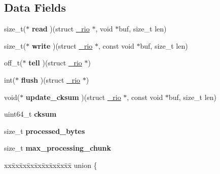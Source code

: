 \subsection*{Data Fields}
\begin{DoxyCompactItemize}
\item 
\mbox{\label{struct__rio_a8ebabb369aa4d0d56b6ffd2458d88576}} 
size\+\_\+t($\ast$ {\bfseries read} )(struct \hyperlink{struct__rio}{\+\_\+rio} $\ast$, void $\ast$buf, size\+\_\+t len)
\item 
\mbox{\label{struct__rio_a8a7effb62e6010e71c1a87e9de88700d}} 
size\+\_\+t($\ast$ {\bfseries write} )(struct \hyperlink{struct__rio}{\+\_\+rio} $\ast$, const void $\ast$buf, size\+\_\+t len)
\item 
\mbox{\label{struct__rio_a66ebd520b048b45e5603fe43f1b0abf9}} 
off\+\_\+t($\ast$ {\bfseries tell} )(struct \hyperlink{struct__rio}{\+\_\+rio} $\ast$)
\item 
\mbox{\label{struct__rio_a0efdc42cde18a29f94c7a848cab51c19}} 
int($\ast$ {\bfseries flush} )(struct \hyperlink{struct__rio}{\+\_\+rio} $\ast$)
\item 
\mbox{\label{struct__rio_a26412d997c7a5e3df0e5d6fd3e604d52}} 
void($\ast$ {\bfseries update\+\_\+cksum} )(struct \hyperlink{struct__rio}{\+\_\+rio} $\ast$, const void $\ast$buf, size\+\_\+t len)
\item 
\mbox{\label{struct__rio_af4d2fe2a30ae204624255e0f13d0cff8}} 
uint64\+\_\+t {\bfseries cksum}
\item 
\mbox{\label{struct__rio_a75ceca68d98b7db8ae88bc8d08f63909}} 
size\+\_\+t {\bfseries processed\+\_\+bytes}
\item 
\mbox{\label{struct__rio_a52f631ed1a65b561d661a91ee54fc882}} 
size\+\_\+t {\bfseries max\+\_\+processing\+\_\+chunk}
\item 
\mbox{\label{struct__rio_a47d4551b43c0212e749c9a2e7fe27f8c}} 
\begin{tabbing}
xx\=xx\=xx\=xx\=xx\=xx\=xx\=xx\=xx\=\kill
union \{\\
\mbox{\label{struct__rio_aab2132e75d76d5a27996a3244325c017}} 

\end{tabbing}
\end{DoxyCompactItemize}
